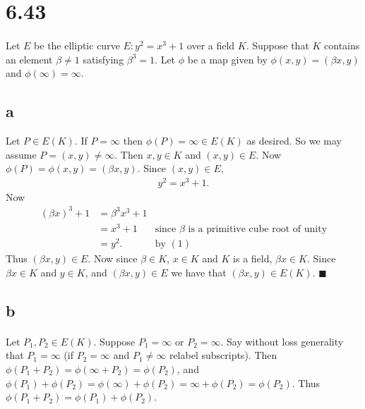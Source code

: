 \documentclass[letterpaper,12pt,oneside,onecolumn]{article}
\begin{document}
\section*{6.43}
\paragraph{}
Let $E$ be the elliptic curve $E: y^2 = x^3 + 1$ over a field $K$. Suppose that $K$ contains an element $\beta \neq 1$ satisfying $\beta^3 = 1$. Let $\phi$ be a map given by $\phi(x,y) = (\beta x, y)$ and $\phi(\infty) = \infty$.
\subsection*{a}
Let $P \in E(K)$. If $P = \infty$ then $\phi(P) = \infty \in E(K)$ as desired. So we may assume $P=(x,y) \neq \infty$. Then $x, y \in K$ and $(x,y) \in E$. Now $\phi(P) = \phi(x,y) = (\beta x, y)$. Since $(x,y) \in E$, \begin{align} y^2 = x^3 + 1. \end{align} Now 
\begin{align*}
(\beta x)^3 + 1 &= \beta^3 x^3 + 1 \\
&= x^3 + 1 &\text{since $\beta$ is a primitive cube root of unity}\\
&= y^2. &\text{by $(1)$}
\end{align*}
Thus $(\beta x, y) \in E$. Now since $\beta \in K$, $x \in K$ and $K$ is a field, $\beta x \in K$. Since $\beta x \in K$ and $y \in K$, and $(\beta x, y) \in E$ we have that $(\beta x, y) \in E(K)$. $\blacksquare$
\subsection*{b}
\paragraph{}
Let $P_1, P_2 \in E(K)$. Suppose $P_1 = \infty$ or $P_2 = \infty$. Say without loss generality that $P_1 = \infty$ (if $P_2 = \infty$ and $P_1 \neq \infty$ relabel subscripts). Then $\phi(P_1 + P_2) = \phi(\infty + P_2) = \phi(P_2)$, and $\phi(P_1) + \phi(P_2) = \phi(\infty) + \phi(P_2) = \infty + \phi(P_2) = \phi(P_2)$. Thus $\phi(P_1 + P_2) = \phi(P_1) + \phi(P_2)$.
\end{document}
